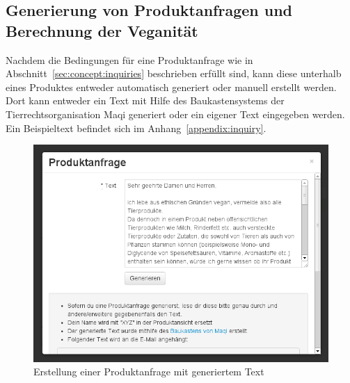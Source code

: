 \subsection{Generierung von Produktanfragen und Berechnung der Veganität}
\label{sec:implementation:inquiries}

Nachdem die Bedingungen für eine Produktanfrage wie in 
Abschnitt~\ref{sec:concept:inquiries} beschrieben erfüllt sind, kann diese 
unterhalb eines Produktes entweder automatisch generiert oder manuell erstellt 
werden.
Dort kann entweder ein Text mit Hilfe des Baukastensystems der
Tierrechtsorganisation Maqi  generiert oder ein 
eigener Text eingegeben werden. Ein Beispieltext befindet sich im
Anhang~\ref{appendix:inquiry}.\\

\begin{figure}[ht]
  \centering
  \includegraphics[scale=0.5]{pics/create_inquiry.png}
  \caption{Erstellung einer Produktanfrage mit generiertem Text}
  \label{img:create_inquiry}
\end{figure}

